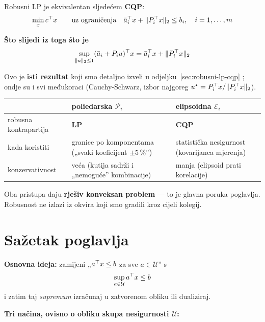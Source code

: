 \begin{teorem}
Robusni LP je ekvivalentan sljedećem \textbf{CQP}:
\[
\min_x c\T x \qquad \uzogr
\bar a_i\T x + \|P_i\T x\|_2 \le b_i, \quad i = 1,\dots,m
\]
\end{teorem}

\textbf{Što slijedi iz toga što je}
\[
\sup_{\|u\|_2\le1}(\bar a_i + P_iu)\T x = \bar a_i\T x + \|P_i\T x\|_2
\]

Ovo je \textbf{isti rezultat} koji smo detaljno izveli u
odjeljku~\ref{sec:robusni-lp-cqp} ; ondje su i svi međukoraci
(Cauchy-Schwarz, izbor najgoreg $u^\star = P_i\T x/\|P_i\T x\|_2$).

\begin{napomena}
\begin{center}
\begin{tabular}{P{3.0cm}P{4.6cm}P{4.8cm}}
\toprule
& \textbf{poliedarska} $\mathcal{P}_i$ & \textbf{elipsoidna} $\mathcal{E}_i$ \\
\midrule
robusna kontrapartija & \textbf{LP} & \textbf{CQP} \\
kada koristiti & granice po komponentama
  („svaki koeficijent $\pm5\,\%$”) & statistička nesigurnost (kovarijanca
  mjerenja) \\
konzervativnost & veća (kutija sadrži i „nemoguće” kombinacije)
  & manja (elipsoid prati korelacije) \\
\bottomrule
\end{tabular}
\end{center}
Oba pristupa daju \textbf{rješiv konveksan problem} --- to je glavna poruka
poglavlja. Robusnost ne izlazi iz okvira koji smo gradili kroz cijeli kolegij.
\end{napomena}

\section{Sažetak poglavlja}

\textbf{Osnovna ideja:} zamijeni „$a\T x \le b$ za sve $a \in \mathcal{U}$” s
\[
\sup_{a\in\mathcal{U}} a\T x \le b
\]
i zatim taj \emph{supremum} izračunaj u zatvorenom obliku ili dualiziraj.

\textbf{Tri načina, ovisno o obliku skupa nesigurnosti $\mathcal{U}$:}

